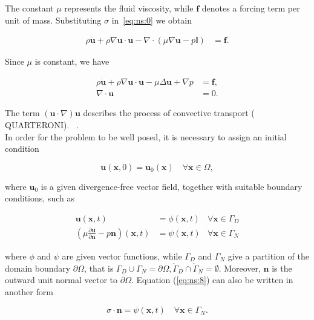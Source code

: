 \documentclass[a4paper,11pt,openright,twoside]{book}
\begin{document}
The constant $\mu$ represents the fluid viscosity, while $\mathbf{f}$ denotes a forcing term per unit of mass. Substituting $\sigma$ in~\eqref{eq:ns:0} we obtain

\begin{align}
\rho \dot{\mathbf{u}} + \rho \nabla \mathbf{u} \cdot \mathbf{u} - \nabla \cdot (\mu \nabla \mathbf{u} - p \mathbb{I}) &= \mathbf{f}.
\end{align}

Since $\mu$ is constant, we have

\begin{align}
\label{eq:ns:3}
\rho \dot{\mathbf{u}} + \rho \nabla \mathbf{u} \cdot \mathbf{u} - \mu \Delta \mathbf{u} +  \nabla p &= \mathbf{f}, \\
\label{eq:ns:3bis}
\nabla \cdot \mathbf{u} &= 0.
\end{align}

The term $(\mathbf{u} \cdot \nabla)\mathbf{u}$ describes the process of convective transport (	QUARTERONI). ~\cite{}.\\
In order for the problem to be well posed, it is necessary to assign an initial condition

\begin{equation}
\mathbf{u} (\mathbf{x}, 0) = \mathbf{u}_0(\mathbf{x}) \quad \forall \mathbf{x} \in \Omega,
\end{equation}

where $\mathbf{u}_0$ is a given divergence-free vector field, together with suitable boundary conditions, such as

\begin{align}
\mathbf{u}(\mathbf{x},t) &= \phi (\mathbf{x}, t) & \forall \mathbf{x} \in \Gamma_D \\
\label{eq:ns:8}
\left( \mu \frac{\partial \mathbf{u}}{\partial \mathbf{n}} - p\mathbf{n} \right) (\mathbf{x},t) &= \psi(\mathbf{x},t) & \forall \mathbf{x} \in \Gamma_N
\end{align}


where $\phi$ and $\psi$ are given vector functions, while $\Gamma_D$ and $\Gamma_N$ give a partition of the domain boundary $\partial \Omega$, that is $\Gamma_D 	\cup \Gamma_N = \partial \Omega, \mathring{\Gamma}_D \cap \mathring{\Gamma}_N = \emptyset$. Moreover, $\mathbf{n}$ is the outward unit normal vector to $\partial \Omega$. Equation (\ref{eq:ns:8}) can also be written in another form

\begin{equation}
\sigma \cdot \mathbf{n} = \psi(\mathbf{x}, t)  \quad \forall \mathbf{x} \in \Gamma_N.
\end{equation}
\end{document}
